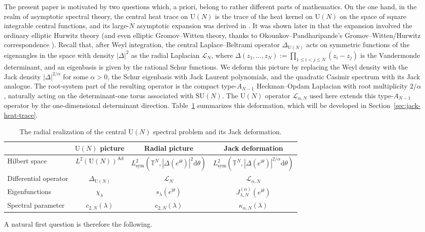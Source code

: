 \documentclass[11pt,a4paper,reqno]{article}
\theoremstyle{definition}
\theoremstyle{remark}
\newcommand\U{{\mathrm U}}
\newcommand\dd{{\mathrm d}}
\begin{document}
The present paper is motivated by two questions which, a priori, belong to rather different parts of mathematics. On the one hand, in the realm of asymptotic spectral theory, the central heat trace on $\U(N)$ is the trace of the heat kernel on $\U(N)$ on the space of square integrable central functions, and its large-$N$ asymptotic expansion was derived in \cite{LemMai25}. It was shown later in \cite{LM2} that the expansion involved the ordinary elliptic Hurwitz theory (and even elliptic Gromov--Witten theory, thanks to Okounkov--Pandharipande's Gromov--Witten/Hurwitz correspondence \cite{OkounkovPandharipande06}). Recall that, after Weyl integration, the central Laplace--Beltrami operator $\Delta_{\U(N)}$ acts on symmetric functions of the eigenangles in the space with density $|\Delta|^2$ as the radial Laplacian $\mathscr L_N$, where $\Delta(z_1,\ldots,z_N):=\prod_{1\leq i<j\leq N}(z_i-z_j)$ is the Vandermonde determinant, and an eigenbasis is given by the rational Schur functions. We deform this picture by replacing the Weyl density with the Jack density $|\Delta|^{2/\alpha}$ for some $\alpha>0$, the Schur eigenbasis with Jack Laurent polynomials, and the quadratic Casimir spectrum with its Jack analogue. The root-system part of the resulting operator is the compact type-$A_{N-1}$ Heckman--Opdam Laplacian with root multiplicity $2/\alpha$ \cite{RemlingRosler11}, naturally acting on the determinant-one torus associated with $\mathrm{SU}(N)$. The $\U(N)$ operator $\mathscr L_{\alpha,N}$ used here extends this type-$A_{N-1}$ operator by the one-dimensional determinant direction. Table~\ref{tab:jack-deformation} summarizes this deformation, which will be developed in Section~\ref{sec:jack-heat-trace}.

\begin{table}[htbp]
\centering
\small
\setlength{\tabcolsep}{4pt}
\renewcommand{\arraystretch}{1.25}
\begin{tabular}{@{}lccc@{}}
\toprule
& $\U(N)$ picture & Radial picture & Jack deformation \\
\midrule
Hilbert space
& $L^2(\U(N))^{\mathrm{Ad}}$
& $L^2_{\mathrm{sym}}\left(\mathbb T^N,|\Delta(e^{\mathrm i\theta})|^2\dd\theta\right)$
& $L^2_{\mathrm{sym}}\left(\mathbb T^N,|\Delta(e^{\mathrm i\theta})|^{2/\alpha}\dd\theta\right)$ \\
Differential operator
& $\Delta_{\U(N)}$
& $\mathscr L_N$
& $\mathscr L_{\alpha,N}$ \\
Eigenfunctions
& $\chi_\lambda$
& $s_\lambda(e^{\mathrm i\theta})$
& $J_{\lambda,N}^{(\alpha)}(e^{\mathrm i\theta})$ \\
Spectral parameter
& $c_{2,N}(\lambda)$
& $c_{2,N}(\lambda)$
& $\kappa_{\alpha,N}(\lambda)$ \\
\bottomrule
\end{tabular}
\caption{The radial realization of the central $\U(N)$ spectral problem and its Jack deformation.}
\label{tab:jack-deformation}
\end{table}
A natural first question is therefore the following.
\end{document}
